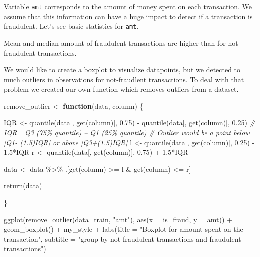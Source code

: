 \documentclass[
]{report}
\newenvironment{Shaded}{\begin{snugshade}}{\end{snugshade}}
\newcommand{\AttributeTok}[1]{\textcolor[rgb]{0.77,0.63,0.00}{#1}}
\newcommand{\CommentTok}[1]{\textcolor[rgb]{0.56,0.35,0.01}{\textit{#1}}}
\newcommand{\ControlFlowTok}[1]{\textcolor[rgb]{0.13,0.29,0.53}{\textbf{#1}}}
\newcommand{\FloatTok}[1]{\textcolor[rgb]{0.00,0.00,0.81}{#1}}
\newcommand{\FunctionTok}[1]{\textcolor[rgb]{0.00,0.00,0.00}{#1}}
\newcommand{\NormalTok}[1]{#1}
\newcommand{\OtherTok}[1]{\textcolor[rgb]{0.56,0.35,0.01}{#1}}
\newcommand{\SpecialCharTok}[1]{\textcolor[rgb]{0.00,0.00,0.00}{#1}}
\newcommand{\StringTok}[1]{\textcolor[rgb]{0.31,0.60,0.02}{#1}}
\begin{document}
Variable \texttt{amt} corresponds to the amount of money spent on each
transaction. We assume that this information can have a huge impact to
detect if a transaction is fraudulent. Let's see basic statistics for
\texttt{amt}.

Mean and median amount of fraudulent transactions are higher than for
not-fraudulent transactions.

We would like to create a boxplot to visualize datapoints, but we
detected to much outliers in observations for not-fraudlent
transactions. To deal with that problem we created our own function
which removes outliers from a dataset.

\begin{Shaded}
\begin{Highlighting}[]
\NormalTok{remove\_outlier }\OtherTok{\textless{}{-}} \ControlFlowTok{function}\NormalTok{(data, column) \{}
  
\NormalTok{  IQR }\OtherTok{\textless{}{-}} \FunctionTok{quantile}\NormalTok{(data[, }\FunctionTok{get}\NormalTok{(column)], }\FloatTok{0.75}\NormalTok{) }\SpecialCharTok{{-}} \FunctionTok{quantile}\NormalTok{(data[, }\FunctionTok{get}\NormalTok{(column)], }\FloatTok{0.25}\NormalTok{) }\CommentTok{\# IQR= Q3 (75\% quantile) – Q1 (25\% quantile)}
  \CommentTok{\# Outlier would be a point below [Q1{-} (1.5)IQR] or above [Q3+(1.5)IQR]}
\NormalTok{  l }\OtherTok{\textless{}{-}} \FunctionTok{quantile}\NormalTok{(data[, }\FunctionTok{get}\NormalTok{(column)], }\FloatTok{0.25}\NormalTok{) }\SpecialCharTok{{-}} \FloatTok{1.5}\SpecialCharTok{*}\NormalTok{IQR}
\NormalTok{  r }\OtherTok{\textless{}{-}} \FunctionTok{quantile}\NormalTok{(data[, }\FunctionTok{get}\NormalTok{(column)], }\FloatTok{0.75}\NormalTok{) }\SpecialCharTok{+} \FloatTok{1.5}\SpecialCharTok{*}\NormalTok{IQR}
  
\NormalTok{  data }\OtherTok{\textless{}{-}}\NormalTok{ data }\SpecialCharTok{\%\textgreater{}\%}
\NormalTok{    .[}\FunctionTok{get}\NormalTok{(column) }\SpecialCharTok{\textgreater{}=}\NormalTok{ l }\SpecialCharTok{\&} \FunctionTok{get}\NormalTok{(column) }\SpecialCharTok{\textless{}=}\NormalTok{ r]}
  
  \FunctionTok{return}\NormalTok{(data)}
  
\NormalTok{\}}
\end{Highlighting}
\end{Shaded}

\begin{Shaded}
\begin{Highlighting}[]
\FunctionTok{ggplot}\NormalTok{(}\FunctionTok{remove\_outlier}\NormalTok{(data\_train, }\StringTok{"amt"}\NormalTok{), }
       \FunctionTok{aes}\NormalTok{(}\AttributeTok{x =}\NormalTok{ is\_fraud, }\AttributeTok{y =}\NormalTok{ amt)) }\SpecialCharTok{+}
  \FunctionTok{geom\_boxplot}\NormalTok{() }\SpecialCharTok{+}
\NormalTok{  my\_style }\SpecialCharTok{+}
  \FunctionTok{labs}\NormalTok{(}\AttributeTok{title =} \StringTok{"Boxplot for amount spent on the transaction"}\NormalTok{,}
       \AttributeTok{subtitle =} \StringTok{"group by not{-}fraudulent transactions and fraudulent transactions"}\NormalTok{)}
\end{Highlighting}
\end{Shaded}
\end{document}

